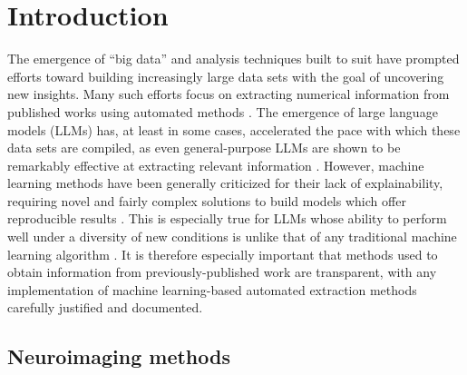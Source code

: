 

\section{Introduction}
\label{sec:papertag.introduction}

The emergence of ``big data'' and analysis techniques built to suit have prompted efforts toward building increasingly large data sets with the goal of uncovering new insights. Many such efforts focus on extracting numerical information from published works using automated methods \cite{OlivettiEtAl2020}. The emergence of large language models (LLMs) has, at least in some cases, accelerated the pace with which these data sets are compiled, as even general-purpose LLMs are shown to be remarkably effective at extracting relevant information \cite{PolakEtAl2023, DunnEtAl2022}. However, machine learning methods have been generally criticized for their lack of explainability, requiring novel and fairly complex solutions to build models which offer reproducible results \cite{DuEtAl2019, Doshi-VelezKim2017}. This is especially true for LLMs whose ability to perform well under a diversity of new conditions is unlike that of any traditional machine learning algorithm \cite{ZhaoEtAl2024}. It is therefore especially important that methods used to obtain information from previously-published work are transparent, with any implementation of machine learning-based automated extraction methods carefully justified and documented.

\subsection{Neuroimaging methods}

